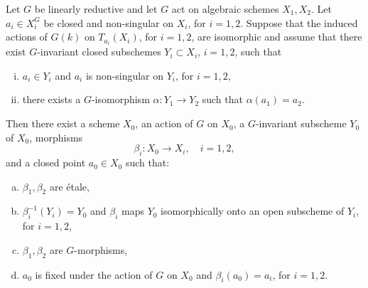 \documentclass[12pt]{article}
\begin{document}
\begin{theorem}[2.4]
Let $G$ be linearly reductive and let $G$ act on algebraic schemes $X_1, X_2$.  
Let $a_i \in X_i^G$ be closed and non-singular on $X_i$, for $i=1,2$.  
Suppose that the induced actions of $G(k)$ on $T_{a_i}(X_i)$, for $i=1,2$, are isomorphic and assume that there exist $G$-invariant closed subschemes $Y_i \subset X_i$, $i=1,2$, such that
\begin{enumerate}[(i)]
  \item $a_i \in Y_i$ and $a_i$ is non-singular on $Y_i$, for $i=1,2$,
  \item there exists a $G$-isomorphism $\alpha : Y_1 \to Y_2$ such that $\alpha(a_1) = a_2$.
\end{enumerate}
Then there exist a scheme $X_0$, an action of $G$ on $X_0$, a $G$-invariant subscheme $Y_0$ of $X_0$, morphisms 
\[
   \beta_i : X_0 \to X_i, \quad i=1,2,
\] 
and a closed point $a_0 \in X_0$ such that:
\begin{enumerate}[(a)]
  \item $\beta_1, \beta_2$ are \'etale,
  \item $\beta_i^{-1}(Y_i) = Y_0$ and $\beta_i$ maps $Y_0$ isomorphically onto an open subscheme of $Y_i$, for $i=1,2$,
  \item $\beta_1, \beta_2$ are $G$-morphisms,
  \item $a_0$ is fixed under the action of $G$ on $X_0$ and $\beta_i(a_0) = a_i$, for $i=1,2$.
\end{enumerate}
\end{theorem}
\end{document}
